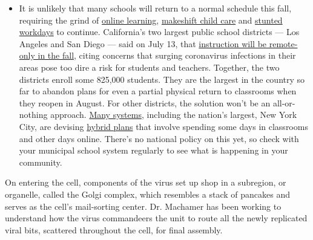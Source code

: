 \begin{itemize}
  \begin{itemize}
  \tightlist
  \item
    It is unlikely that many schools will return to a normal schedule
    this fall, requiring the grind of
    \href{https://www.nytimes3xbfgragh.onion/2020/06/05/us/coronavirus-education-lost-learning.html?action=click\&pgtype=Article\&state=default\&region=MAIN_CONTENT_3\&context=storylines_faq}{online
    learning},
    \href{https://www.nytimes3xbfgragh.onion/2020/05/29/us/coronavirus-child-care-centers.html?action=click\&pgtype=Article\&state=default\&region=MAIN_CONTENT_3\&context=storylines_faq}{makeshift
    child care} and
    \href{https://www.nytimes3xbfgragh.onion/2020/06/03/business/economy/coronavirus-working-women.html?action=click\&pgtype=Article\&state=default\&region=MAIN_CONTENT_3\&context=storylines_faq}{stunted
    workdays} to continue. California's two largest public school
    districts --- Los Angeles and San Diego --- said on July 13, that
    \href{https://www.nytimes3xbfgragh.onion/2020/07/13/us/lausd-san-diego-school-reopening.html?action=click\&pgtype=Article\&state=default\&region=MAIN_CONTENT_3\&context=storylines_faq}{instruction
    will be remote-only in the fall}, citing concerns that surging
    coronavirus infections in their areas pose too dire a risk for
    students and teachers. Together, the two districts enroll some
    825,000 students. They are the largest in the country so far to
    abandon plans for even a partial physical return to classrooms when
    they reopen in August. For other districts, the solution won't be an
    all-or-nothing approach.
    \href{https://bioethics.jhu.edu/research-and-outreach/projects/eschool-initiative/school-policy-tracker/}{Many
    systems}, including the nation's largest, New York City, are
    devising
    \href{https://www.nytimes3xbfgragh.onion/2020/06/26/us/coronavirus-schools-reopen-fall.html?action=click\&pgtype=Article\&state=default\&region=MAIN_CONTENT_3\&context=storylines_faq}{hybrid
    plans} that involve spending some days in classrooms and other days
    online. There's no national policy on this yet, so check with your
    municipal school system regularly to see what is happening in your
    community.
  \end{itemize}
\end{itemize}

On entering the cell, components of the virus set up shop in a
subregion, or organelle, called the Golgi complex, which resembles a
stack of pancakes and serves as the cell's mail-sorting center. Dr.
Machamer has been working to understand how the virus commandeers the
unit to route all the newly replicated viral bits, scattered throughout
the cell, for final assembly.

